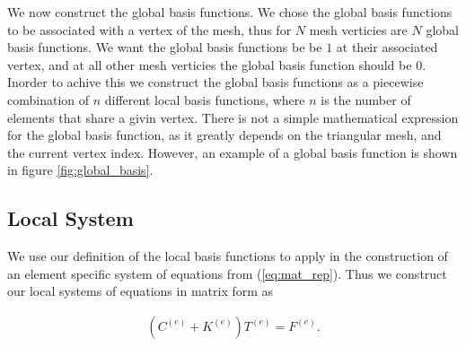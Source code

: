\documentclass[../fem.tex]{subfiles}
\begin{document}
We now construct the global basis functions. We chose the global basis
functions to be associated with a vertex of the mesh, thus for $N$ mesh
verticies are $N$ global basis functions. We want the global basis functions be
be $1$ at their associated vertex, and at all other mesh verticies the global
basis function should be $0$. Inorder to achive this we construct the global
basis functions as a piecewise combination of $n$ different local basis
functions, where $n$ is the number of elements that share a givin vertex. There
is not a simple mathematical expression for the global basis function, as it
greatly depends on the triangular mesh, and the current vertex index. However,
an example of a global basis function is shown in figure
\ref{fig:global_basis}.

\begin{Figure}
   \begin{center}
   \end{center}
   \label{fig:global_basis}
\end{Figure}

\subsection{Local System}%
\label{sub:local_system}

We use our definition of the local basis functions to apply in the construction
of an element specific system of equations from (\ref{eq:mat_rep}). Thus we
construct our local systems of equations in matrix form as

\begin{align*}
  \left(C^{(e)}+K^{(e)}\right)T^{(e)}=F^{(e)}.
\end{align*}
\end{document}
